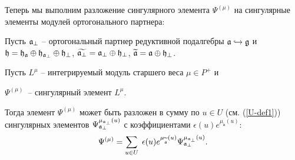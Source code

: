 \label{subsec:decomp-sing-element-again}

Теперь мы выполним разложение сингулярного элемента  $\Psi ^{\left(\mu \right) }$ на сингулярные элементы модулей ортогонального партнера:

\begin{lemma}

Пусть  $\frak{a}_{\bot }$ -- ортогональный партнер редуктивной подалгебры  $\frak{a}\hookrightarrow \frak{g}$ и $\frak{h}=\frak{\frak{h}_{\frak{a}}}\oplus \frak{h}_{\frak{a}_{\perp }}\oplus \frak{h}_{\perp }$, $\widetilde{%
\frak{a}_{\perp }}=\frak{a}_{\perp }\oplus \frak{h}_{\perp }$, $%
\widetilde{\frak{a}}=\frak{a}\oplus \frak{h}_{\perp }$.

Пусть $L^{\mu }$ -- интегрируемый модуль старшего веса  $\mu \in P^{+}$ и 

$\Psi ^{\left( \mu \right) }$\ -- сингулярный элемент $L^{\mu }$.

Тогда элемент  $\Psi ^{\left( \mu \right) }$ может быть разложен в сумму по  $u\in U$ (см. (\ref{U-def1})) сингулярных элементов $\Psi _{\frak{a}_{\perp }}^{\mu _{\frak{a}_{\perp }}\left( u\right) }$ с коэффициентами
$\epsilon (u)e^{\mu _{\widetilde{\mathfrak{a}}}\left( u\right) }$:
\begin{equation}
\Psi ^{\left( \mu \right) }=\sum_{u\in U}\;\epsilon (u)e^{\mu _{\widetilde{%
\mathfrak{a}}}\left( u\right) }\Psi _{\frak{a}_{\perp }}^{\mu _{\frak{a}%
_{\perp }}\left( u\right) }.  \label{sing decomp main}
\end{equation}
\label{Psi-decomp-lemma}
\end{lemma}

